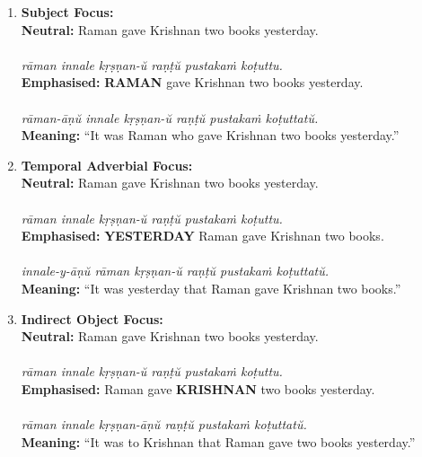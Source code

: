 \begin{enumerate}[label=\textbf{\arabic*.}]

    \item \textbf{Subject Focus:}\\
    \textbf{Neutral:} Raman gave Krishnan two books yesterday.\\
    \\
    \textit{rāman innale kṛṣṇan-ŭ raṇṭŭ pustakaṁ koṭuttu.}\\
    \textbf{Emphasised:} \textbf{RAMAN} gave Krishnan two books yesterday.\\
    \\
    \textit{rāman-āṇŭ innale kṛṣṇan-ŭ raṇṭŭ pustakaṁ koṭuttatŭ.}\\
    \textbf{Meaning:} ``It was Raman who gave Krishnan two books yesterday.''

    \item \textbf{Temporal Adverbial Focus:}\\
    \textbf{Neutral:} Raman gave Krishnan two books yesterday.\\
    \\
    \textit{rāman innale kṛṣṇan-ŭ raṇṭŭ pustakaṁ koṭuttu.}\\
    \textbf{Emphasised:} \textbf{YESTERDAY} Raman gave Krishnan two books.\\
    \\
    \textit{innale-y-āṇŭ rāman kṛṣṇan-ŭ raṇṭŭ pustakaṁ koṭuttatŭ.}\\
    \textbf{Meaning:} ``It was yesterday that Raman gave Krishnan two books.''

    \item \textbf{Indirect Object Focus:}\\
    \textbf{Neutral:} Raman gave Krishnan two books yesterday.\\
    \\
    \textit{rāman innale kṛṣṇan-ŭ raṇṭŭ pustakaṁ koṭuttu.}\\
    \textbf{Emphasised:} Raman gave \textbf{KRISHNAN} two books yesterday.\\
    \\
    \textit{rāman innale kṛṣṇan-āṇŭ raṇṭŭ pustakaṁ koṭuttatŭ.}\\
    \textbf{Meaning:} ``It was to Krishnan that Raman gave two books yesterday.''

\end{enumerate}

